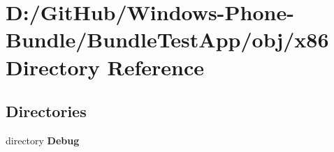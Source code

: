 \section{D\+:/\+Git\+Hub/\+Windows-\/\+Phone-\/\+Bundle/\+Bundle\+Test\+App/obj/x86 Directory Reference}
\label{dir_f3ce8ed253788d2884ec28c4ea04db31}
\subsection*{Directories}
\begin{DoxyCompactItemize}
\item 
directory {\bf Debug}
\end{DoxyCompactItemize}
